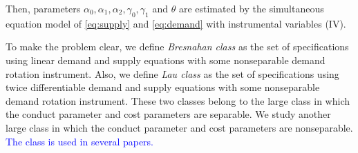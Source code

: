 \documentclass[11pt, a4paper]{article}
\begin{document}
Then, parameters $\alpha_0,\alpha_1,\alpha_2,\gamma_0,\gamma_1$ and $\theta$ are estimated by the simultaneous equation model of \eqref{eq:supply} and \eqref{eq:demand} with instrumental variables (IV).

To make the problem clear, we define \textit{Bresnahan class} as the set of specifications using linear demand and supply equations with some nonseparable demand rotation instrument. Also, we define \textit{Lau class} as the set of specifications using twice differentiable demand and supply equations with some nonseparable demand rotation instrument. These two classes belong to the large class in which the conduct parameter and cost parameters are separable. We study another large class in which the conduct parameter and cost parameters are nonseparable. \textcolor{blue}{The class is used in several papers.}
\end{document}

